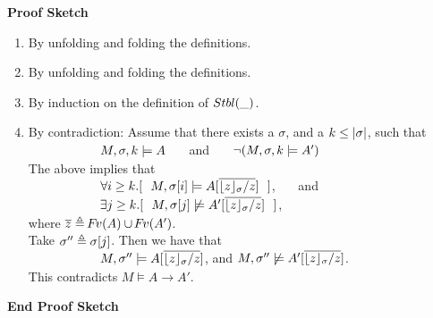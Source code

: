  


  
\noindent
\vspace{.1cm}
{\textbf{Proof Sketch}} 

\begin{enumerate}
\item
By unfolding and folding the definitions.
\item
By unfolding and folding the definitions.
\item
By induction on the definition of ${Stbl( \_ )}$.
\item
  By contradiction: Assume that there exists a $\sigma$,  and a  $k\leq |\sigma|$,    such that  \\
$\strut \hspace{2cm}   M,\sigma ,{k} \models {A} $ \ \ \ and \ \ \ $\neg (M,\sigma ,{k} \models {A} ')$\\
 The  above implies that \\
$\strut \hspace{2cm} \forall i\geq k.[\ \ M,{\RestictTo {\sigma}{i}} \models A[\overline{ {{\interpret \sigma z}/ z}}]\ \ ]$, \ \ \ and\\
$\strut \hspace{2cm} \exists j\geq k.[\ \  M,{\RestictTo {\sigma}{j}} \not\models A'[ \overline{ {{\interpret \sigma z}/ z}}]\ \ ]$,\\
 where  $\overline z \triangleq {\hspace{-1pt}F\hspace{-1pt}}v(A)\cup {\hspace{-1pt}F\hspace{-1pt}}v(A')$.\\
 Take $\sigma''\triangleq  \sigma[j]$. Then we have that\\
$\strut \hspace{2cm} M, \sigma'' \models A[\overline{ {{\lfloor z \rfloor_{\sigma}}/ z}}]$,  and  $M,  \sigma'' \not\models A'[\overline{ {{\lfloor z \rfloor_{\sigma}}/ z}}]$.\\
 This contradicts $ M  \models A \rightarrow A'$.\\
 {}
 {}
\end{enumerate}
\noindent
{\textbf{End Proof Sketch}} 

